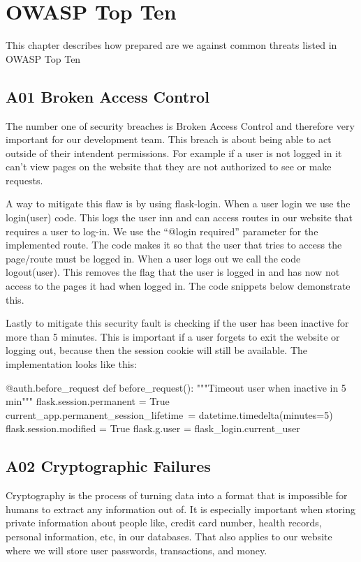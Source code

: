 
\chapter{OWASP Top Ten
}\label{kap:owasptopten}

This chapter describes how prepared are we against common threats listed in OWASP Top Ten

\section{A01 Broken Access Control}

The number one of security breaches is Broken Access Control and therefore very important for our development team. This breach is about being able to act outside of their intendent permissions. For example if a user is not logged in it can’t view pages on the website that they are not authorized to see or make requests. 

A way to mitigate this flaw is by using flask-login. When a user login we use the login(user) code. This logs the user inn and can access routes in our website that requires a user to log-in. We use the “@login required” parameter for the implemented route. The code makes it so that the user that tries to access the page/route must be logged in. When a user logs out we call the code logout(user). This removes the flag that the user is logged in and has now not access to the pages it had when logged in. The code snippets below demonstrate this. 

Lastly to mitigate this security fault is checking if the user has been inactive for more than 5 minutes. This is important if a user forgets to exit the website or logging out, because then the session cookie will still be available. The implementation looks like this:

\begin{python}
@auth.before_request
def before_request():
    """Timeout user when inactive in 5 min"""
    flask.session.permanent = True
    current_app.permanent_session_lifetime\
        = datetime.timedelta(minutes=5)
    flask.session.modified = True
    flask.g.user = flask_login.current_user
\end{python}

\section{A02 Cryptographic Failures}
Cryptography is the process of turning data into a format that is impossible for humans to extract any information out of. It is especially important when storing private information about people like, credit card number, health records, personal information, etc, in our databases. That also applies to our website where we will store user passwords, transactions, and money.
